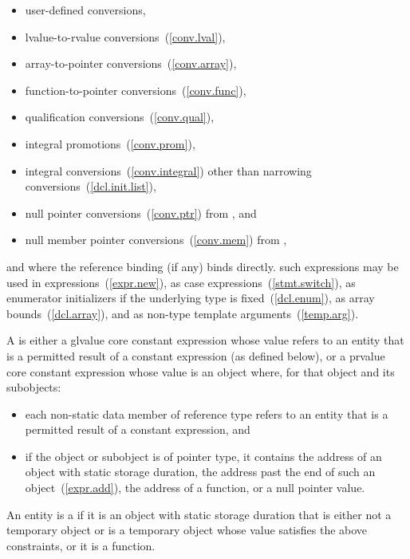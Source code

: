 \begin{itemize}
\item user-defined conversions,
\item lvalue-to-rvalue conversions~(\ref{conv.lval}),
\item array-to-pointer conversions~(\ref{conv.array}),
\item function-to-pointer conversions~(\ref{conv.func}),
\item qualification conversions~(\ref{conv.qual}),
\item integral promotions~(\ref{conv.prom}),
\item integral conversions~(\ref{conv.integral}) other than narrowing conversions~(\ref{dcl.init.list}),
\item null pointer conversions~(\ref{conv.ptr}) from , and
\item null member pointer conversions~(\ref{conv.mem}) from ,
\end{itemize}

and where the reference binding (if any) binds directly.
\enternote
such expressions may be used in 
expressions~(\ref{expr.new}), as case expressions~(\ref{stmt.switch}),
as enumerator initializers if the underlying type is
fixed~(\ref{dcl.enum}), as array bounds~(\ref{dcl.array}), and
as non-type template
arguments~(\ref{temp.arg}). 
\exitnote

\pnum
A  is either
a glvalue core constant expression whose value refers to
an entity that is a permitted result of a constant expression (as defined below), or
a prvalue core constant expression whose value is an object where, for that
object and its subobjects:

\begin{itemize}
  \item
  each non-static data member of reference type refers to
  an entity that is a permitted result of a constant expression, and

  \item
  if the object or subobject is of pointer type, it contains
  the address of an object with static storage duration,
  the address past the end of such an object~(\ref{expr.add}),
  the address of a function,
  or a null pointer value.
\end{itemize}
%
An entity is a  if it is an
object with static storage duration that is either not a temporary object or is
a temporary object whose value satisfies the above constraints, or it is a
function.

